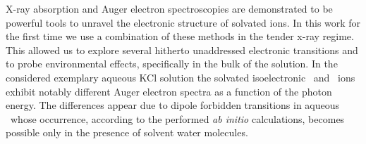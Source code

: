 X-ray absorption and Auger electron spectroscopies are demonstrated to be powerful tools to unravel the electronic structure of solvated ions. In this work for the first time we use a combination of these methods in the tender x-ray regime. This allowed us to explore several hitherto unaddressed electronic transitions and to probe environmental effects, specifically in the bulk of the solution. In the considered exemplary aqueous KCl solution the solvated isoelectronic \ki~and \cli~ions exhibit notably different Auger electron spectra as a function of the photon energy. The differences appear due to dipole forbidden transitions in aqueous \ki~whose occurrence, according to the performed {\it ab initio} calculations, becomes possible only in the presence of solvent water molecules.


